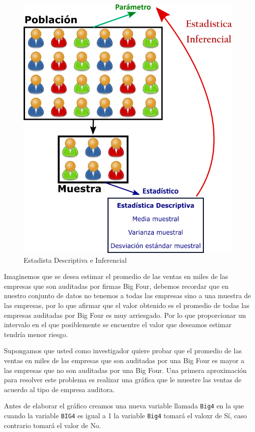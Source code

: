 \documentclass[letterpaper,]{book}
\newenvironment{Shaded}{\begin{snugshade}}{\end{snugshade}}
\newcommand{\DataTypeTok}[1]{\textcolor[rgb]{0.13,0.29,0.53}{#1}}
\newcommand{\DecValTok}[1]{\textcolor[rgb]{0.00,0.00,0.81}{#1}}
\newcommand{\KeywordTok}[1]{\textcolor[rgb]{0.13,0.29,0.53}{\textbf{#1}}}
\newcommand{\NormalTok}[1]{#1}
\newcommand{\OperatorTok}[1]{\textcolor[rgb]{0.81,0.36,0.00}{\textbf{#1}}}
\newcommand{\StringTok}[1]{\textcolor[rgb]{0.31,0.60,0.02}{#1}}
\begin{document}
\begin{figure}[h!]

{\centering \includegraphics[width=0.55\linewidth]{infedesc} 

}

\caption{Estadista Descriptiva e Inferencial}\label{fig:infedesc}
\end{figure}

Imaginemos que se desea estimar el promedio de las ventas en miles de las empresas que son auditadas por firmas Big Four, debemos recordar que en nuestro conjunto de datos no tenemos a todas las empresas sino a una muestra de las empresas, por lo que afirmar que el valor obtenido es el promedio de todas las empresas auditadas por Big Four es muy arriesgado. Por lo que proporcionar un intervalo en el que posiblemente se encuentre el valor que deseamos estimar tendría menor riesgo.

Supongamos que usted como investigador quiere probar que el promedio de las ventas en miles de las empresas que son auditadas por una Big Four es mayor a las empresas que no son auditadas por una Big Four. Una primera aproximación para resolver este problema es realizar una gráfica que le muestre las ventas de acuerdo al tipo de empresa auditora.

Antes de elaborar el gráfico creamos una nueva variable llamada \texttt{Big4} en la que cuando la variable \texttt{BIG4} es igual a 1 la variable \texttt{Big4} tomará el valoxr de Sí, caso contrario tomará el valor de No.~

\begin{Shaded}
\end{Shaded}
\end{document}
